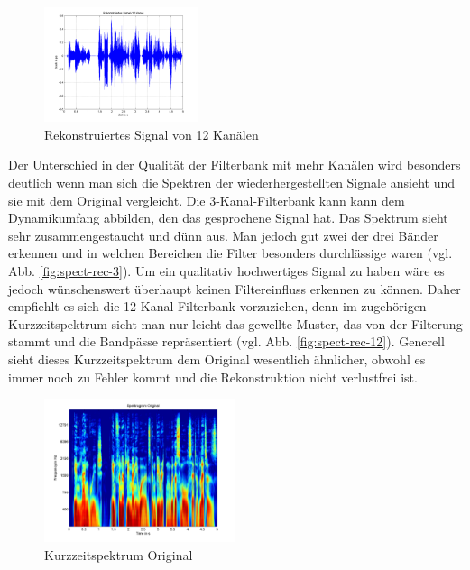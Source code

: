 \documentclass[conference]{IEEEtran}
\begin{document}
\begin{compactenum}[a)]
\begin{figure}[h!]
	\vspace{-5pt}
	\centering
	\includegraphics[width=0.4\textwidth]{img/sig_rec_12.png}
	\vspace{-10pt}
	\caption{Rekonstruiertes Signal von 12 Kanälen}
	\vspace{-10pt}
	\label{fig:sig-rec-12}
\end{figure}
\newpage
\item Der Unterschied in der Qualität der Filterbank mit mehr Kanälen wird besonders deutlich wenn man sich die Spektren der wiederhergestellten Signale ansieht und sie mit dem Original vergleicht. Die 3-Kanal-Filterbank kann kann dem Dynamikumfang abbilden, den das gesprochene Signal hat. Das Spektrum sieht sehr zusammengestaucht und dünn aus. Man jedoch gut zwei der drei Bänder erkennen und in welchen Bereichen die Filter besonders durchlässige waren (vgl. Abb. \ref{fig:spect-rec-3}). Um ein qualitativ hochwertiges Signal zu haben wäre es jedoch wünschenswert überhaupt keinen Filtereinfluss erkennen zu können. Daher empfiehlt es sich die 12-Kanal-Filterbank vorzuziehen, denn im zugehörigen Kurzzeitspektrum sieht man nur leicht das gewellte Muster, das von der Filterung stammt und die Bandpässe repräsentiert (vgl. Abb. \ref{fig:spect-rec-12}). Generell sieht dieses Kurzzeitspektrum dem Original wesentlich ähnlicher, obwohl es immer noch zu Fehler kommt und die Rekonstruktion nicht verlustfrei ist. 
\begin{figure}[h!]
	\centering
	\includegraphics[width=0.5\textwidth]{img/spect_orig.png}
	\caption{Kurzzeitspektrum Original}
	\label{fig:spect-orig}
\end{figure}


\end{compactenum}
\end{document}
